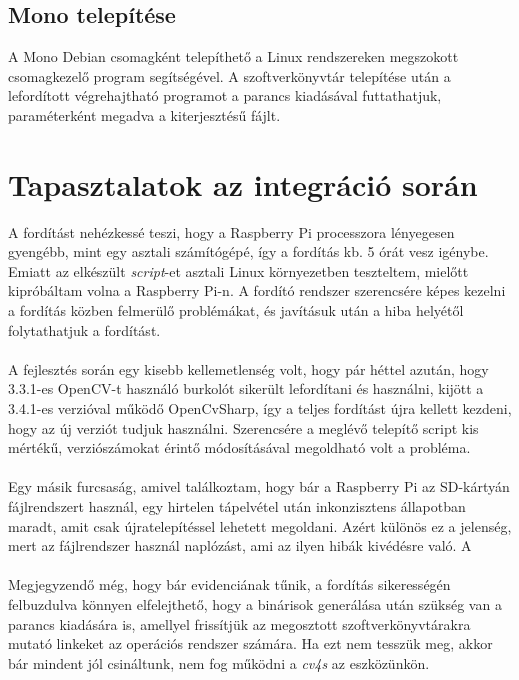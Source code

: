 \subsection{Mono telepítése}

A Mono Debian csomagként telepíthető a Linux rendszereken megszokott  csomagkezelő program segítségével. A szoftverkönyvtár telepítése után a lefordított végrehajtható programot a  parancs kiadásával futtathatjuk, paraméterként megadva a  kiterjesztésű fájlt.

\section{Tapasztalatok az integráció során}

A fordítást nehézkessé teszi, hogy a Raspberry Pi processzora lényegesen gyengébb, mint egy asztali számítógépé, így a fordítás kb. 5 órát vesz igénybe. Emiatt az elkészült \textit{script}-et asztali Linux környezetben teszteltem, mielőtt kipróbáltam volna a Raspberry Pi-n. A  fordító rendszer szerencsére képes kezelni a fordítás közben felmerülő problémákat, és javításuk után a hiba helyétől folytathatjuk a fordítást.\\
\\
A fejlesztés során egy kisebb kellemetlenség volt, hogy pár héttel azután, hogy 3.3.1-es OpenCV-t használó burkolót sikerült lefordítani és használni, kijött a 3.4.1-es verzióval működő OpenCvSharp, így a teljes fordítást újra kellett kezdeni, hogy az új verziót tudjuk használni. Szerencsére a meglévő telepítő script kis mértékű, verziószámokat érintő módosításával megoldható volt a probléma.\\
\\
Egy másik furcsaság, amivel találkoztam, hogy bár a Raspberry Pi az SD-kártyán  fájlrendszert használ, egy hirtelen tápelvétel után inkonzisztens állapotban maradt, amit csak újratelepítéssel lehetett megoldani. Azért különös ez a jelenség, mert az  fájlrendszer használ naplózást, ami az ilyen hibák kivédésre való. A \\
\\
Megjegyzendő még, hogy bár evidenciának tűnik, a fordítás sikerességén felbuzdulva könnyen elfelejthető, hogy a binárisok generálása után szükség van a  parancs kiadására is, amellyel frissítjük az megosztott szoftverkönyvtárakra mutató linkeket az operációs rendszer számára. Ha ezt nem tesszük meg, akkor bár mindent jól csináltunk, nem fog működni a \emph{cv4s} az eszközünkön.

